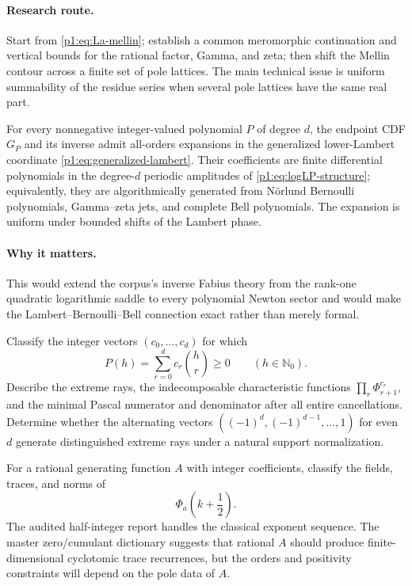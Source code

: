\documentclass[11pt,oneside]{article}
\numberwithin{equation}{section}
\theoremstyle{definition}
\theoremstyle{remark}
\newcommand{\N}{\mathbb N}
\begin{document}
\paragraph{Research route.}
Start from \eqref{p1:eq:La-mellin}; establish a common meromorphic continuation and vertical
bounds for the rational factor, Gamma, and zeta; then shift the Mellin contour across a
finite set of pole lattices.  The main technical issue is uniform summability of the residue
series when several pole lattices have the same real part.

\begin{conjecture}
\label{p1:conj:inverse-transseries}
For every nonnegative integer-valued polynomial $P$ of degree $d$, the endpoint CDF $G_P$ and
its inverse admit all-orders expansions in the generalized lower-Lambert coordinate
\eqref{p1:eq:generalized-lambert}.  Their coefficients are finite differential polynomials in
the degree-$d$ periodic amplitudes of \eqref{p1:eq:logLP-structure}; equivalently, they are
algorithmically generated from N\"orlund Bernoulli polynomials, Gamma--zeta jets, and
complete Bell polynomials.  The expansion is uniform under bounded shifts of the Lambert
phase.
\end{conjecture}

\paragraph{Why it matters.}
This would extend the corpus's inverse Fabius theory from the rank-one quadratic logarithmic
saddle to every polynomial Newton sector and would make the Lambert--Bernoulli--Bell
connection exact rather than merely formal.

\begin{problem}
\label{p1:prob:newton-cone}
Classify the integer vectors $(c_0,\ldots,c_d)$ for which
\[
 P(h)=\sum_{r=0}^{d}c_r\binom hr\ge0
 \qquad(h\in\N_0).
\]
Describe the extreme rays, the indecomposable characteristic functions
$\prod_r\Phi_{r+1}^{c_r}$, and the minimal Pascal numerator and denominator after all entire
cancellations.  Determine whether the alternating vectors
$((-1)^d,(-1)^{d-1},\ldots,1)$ for even $d$ generate distinguished extreme rays under a
natural support normalization.
\end{problem}

\begin{problem}
For a rational generating function $A$ with integer coefficients, classify the fields,
traces, and norms of
\[
 \Phi_a\!\left(k+\frac12\right).
\]
The audited half-integer report handles the classical exponent sequence.  The master
zero/cumulant dictionary suggests that rational $A$ should produce finite-dimensional
cyclotomic trace recurrences, but the orders and positivity constraints will depend on the
pole data of $A$.
\end{problem}
\end{document}
